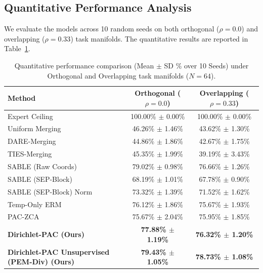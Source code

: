 \subsection{Quantitative Performance Analysis}
We evaluate the models across 10 random seeds on both orthogonal ($\rho = 0.0$) and overlapping ($\rho = 0.33$) task manifolds. The quantitative results are reported in Table~\ref{tab:main_results}.

\begin{table}[h]
\centering
\caption{Quantitative performance comparison (Mean $\pm$ SD \% over 10 Seeds) under Orthogonal and Overlapping task manifolds ($N = 64$).}
\label{tab:main_results}
\vskip 0.1in
\begin{tabular}{lcc}
\toprule
\textbf{Method} & \textbf{Orthogonal ($\rho = 0.0$)} & \textbf{Overlapping ($\rho = 0.33$)} \\
\midrule
Expert Ceiling & 100.00\% $\pm$ 0.00\% & 100.00\% $\pm$ 0.00\% \\
Uniform Merging & 46.26\% $\pm$ 1.46\% & 43.62\% $\pm$ 1.30\% \\
DARE-Merging & 44.86\% $\pm$ 1.86\% & 42.67\% $\pm$ 1.75\% \\
TIES-Merging & 45.35\% $\pm$ 1.99\% & 39.19\% $\pm$ 3.43\% \\
\midrule
SABLE (Raw Coords) & 79.02\% $\pm$ 0.98\% & 76.66\% $\pm$ 1.26\% \\
SABLE (SEP-Block) & 68.19\% $\pm$ 1.01\% & 67.78\% $\pm$ 0.90\% \\
SABLE (SEP-Block) Norm & 73.32\% $\pm$ 1.39\% & 71.52\% $\pm$ 1.62\% \\
Temp-Only ERM & 76.12\% $\pm$ 1.86\% & 75.67\% $\pm$ 1.93\% \\
PAC-ZCA & 75.67\% $\pm$ 2.04\% & 75.95\% $\pm$ 1.85\% \\
\midrule
\textbf{Dirichlet-PAC (Ours)} & \textbf{77.88\% $\pm$ 1.19\%} & \textbf{76.32\% $\pm$ 1.20\%} \\
\textbf{Dirichlet-PAC Unsupervised (PEM-Div) (Ours)} & \textbf{79.43\% $\pm$ 1.05\%} & \textbf{78.73\% $\pm$ 1.08\%} \\
\bottomrule
\end{tabular}
\end{table}

